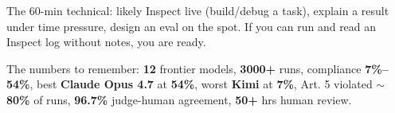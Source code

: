 The 60-min technical: likely Inspect live (build/debug a task), explain a result under time pressure, design an eval on the spot. If you can run and read an Inspect log without notes, you are ready.

The numbers to remember: \textbf{12} frontier models, \textbf{3000+} runs, compliance \textbf{7\%–54\%}, best \textbf{Claude Opus 4.7} at \textbf{54\%}, worst \textbf{Kimi} at \textbf{7\%}, Art. 5 violated $\sim$\textbf{80\%} of runs, \textbf{96.7\%} judge-human agreement, \textbf{50+} hrs human review.
